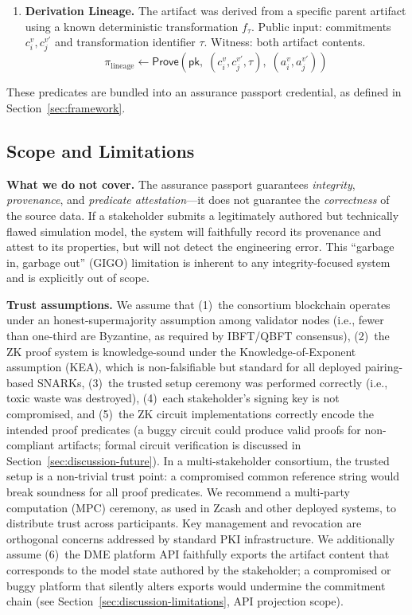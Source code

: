 \begin{enumerate}
    \item \textbf{Derivation Lineage.} The artifact was derived from a specific parent artifact using a known deterministic transformation $f_\tau$.
    Public input: commitments $c_i^{v}, c_j^{v'}$ and transformation identifier $\tau$. Witness: both artifact contents.
    \begin{equation}
    \label{eq:lineage}
    \pi_{\text{lineage}} \leftarrow \textsf{Prove}\!\left(\mathsf{pk},\; (c_i^{v}, c_j^{v'}, \tau),\; (a_i^{v}, a_j^{v'})\right)
    \end{equation}
\end{enumerate}

These predicates are bundled into an assurance passport credential, as defined in Section~\ref{sec:framework}.

\subsection{Scope and Limitations}
\label{sec:scope}

\textbf{What we do not cover.}
The assurance passport guarantees \emph{integrity}, \emph{provenance}, and \emph{predicate attestation}---it does not guarantee the \emph{correctness} of the source data.
If a stakeholder submits a legitimately authored but technically flawed simulation model, the system will faithfully record its provenance and attest to its properties, but will not detect the engineering error.
This ``garbage in, garbage out'' (GIGO) limitation is inherent to any integrity-focused system and is explicitly out of scope.

\textbf{Trust assumptions.}
We assume that (1)~the consortium blockchain operates under an honest-supermajority assumption among validator nodes (i.e., fewer than one-third are Byzantine, as required by IBFT/QBFT consensus), (2)~the ZK proof system is knowledge-sound under the Knowledge-of-Exponent assumption (KEA), which is non-falsifiable but standard for all deployed pairing-based SNARKs, (3)~the trusted setup ceremony was performed correctly (i.e., toxic waste was destroyed), (4)~each stakeholder's signing key is not compromised, and (5)~the ZK circuit implementations correctly encode the intended proof predicates (a buggy circuit could produce valid proofs for non-compliant artifacts; formal circuit verification is discussed in Section~\ref{sec:discussion-future}).
In a multi-stakeholder consortium, the trusted setup is a non-trivial trust point: a compromised common reference string would break soundness for all proof predicates.
We recommend a multi-party computation (MPC) ceremony, as used in Zcash and other deployed systems, to distribute trust across participants.
Key management and revocation are orthogonal concerns addressed by standard PKI infrastructure.
We additionally assume (6)~the DME platform API faithfully exports the artifact content that corresponds to the model state authored by the stakeholder; a compromised or buggy platform that silently alters exports would undermine the commitment chain (see Section~\ref{sec:discussion-limitations}, API projection scope).

